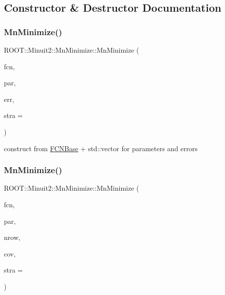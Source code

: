 \subsection{Constructor \& Destructor Documentation}
\mbox{\label{classROOT_1_1Minuit2_1_1MnMinimize_ab556cdc37be07557d060aa179a7e0d1f}} 
\subsubsection{\texorpdfstring{MnMinimize()}{MnMinimize()}\hspace{0.1cm}{\footnotesize\ttfamily [1/39]}}
{\footnotesize\ttfamily R\+O\+O\+T\+::\+Minuit2\+::\+Mn\+Minimize\+::\+Mn\+Minimize (\begin{DoxyParamCaption}\item[{const \mbox{\hyperlink{classROOT_1_1Minuit2_1_1FCNBase}{F\+C\+N\+Base}} \&}]{fcn,  }\item[{const std\+::vector$<$ double $>$ \&}]{par,  }\item[{const std\+::vector$<$ double $>$ \&}]{err,  }\item[{unsigned int}]{stra = {} }\end{DoxyParamCaption})\hspace{0.3cm}{\ttfamily [inline]}}



construct from \mbox{\hyperlink{classROOT_1_1Minuit2_1_1FCNBase}{F\+C\+N\+Base}} + std\+::vector for parameters and errors 

\mbox{\label{classROOT_1_1Minuit2_1_1MnMinimize_ad6015768309e01c6610185006008b2d5}} 
\subsubsection{\texorpdfstring{MnMinimize()}{MnMinimize()}\hspace{0.1cm}{\footnotesize\ttfamily [2/39]}}
{\footnotesize\ttfamily R\+O\+O\+T\+::\+Minuit2\+::\+Mn\+Minimize\+::\+Mn\+Minimize (\begin{DoxyParamCaption}\item[{const \mbox{\hyperlink{classROOT_1_1Minuit2_1_1FCNBase}{F\+C\+N\+Base}} \&}]{fcn,  }\item[{const std\+::vector$<$ double $>$ \&}]{par,  }\item[{unsigned int}]{nrow,  }\item[{const std\+::vector$<$ double $>$ \&}]{cov,  }\item[{unsigned int}]{stra = {} }\end{DoxyParamCaption})\hspace{0.3cm}{\ttfamily [inline]}}



